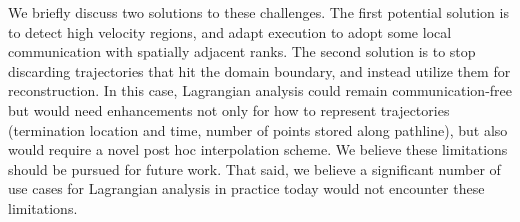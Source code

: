 We briefly discuss two solutions to these challenges.
%
The first potential solution is to detect high velocity regions, and adapt execution to adopt some local communication with spatially adjacent ranks.
%
%
%
The second solution is to stop discarding trajectories that hit the domain boundary, and instead utilize them for reconstruction. 
%
In this case, Lagrangian analysis could remain communication-free but would need enhancements not only for how to represent trajectories (termination location and time, number of points stored along pathline), but also would require a novel post hoc interpolation scheme.
%
%
%
We believe these limitations should be pursued for future work. 
%
That said, we believe a significant number of use cases for Lagrangian analysis in practice today would not encounter these limitations. 
